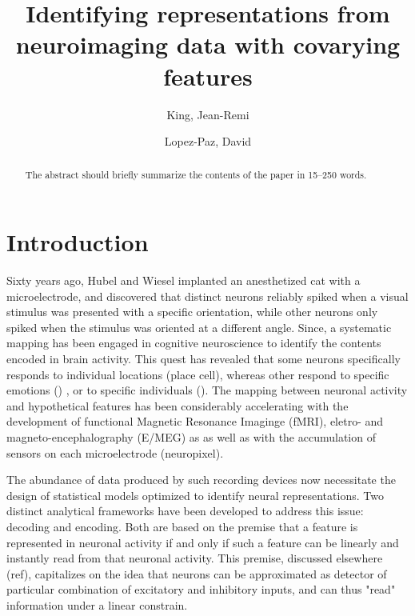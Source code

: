 \documentclass[runningheads]{llncs}
\begin{document}
\title{Identifying representations from neuroimaging data with covarying features}

\author{King, Jean-Remi \and Lopez-Paz, David }


\maketitle              %

\begin{abstract}
The abstract should briefly summarize the contents of the paper in
15--250 words.

\end{abstract}

\section{Introduction}
Sixty years ago, Hubel and Wiesel implanted an anesthetized cat with a microelectrode, and discovered that distinct neurons reliably spiked when a visual stimulus was presented with a specific orientation, while other neurons only spiked when the stimulus was oriented at a different angle. Since, a systematic mapping has been engaged in cognitive neuroscience to identify the contents encoded in brain activity. This quest has revealed that some neurons specifically responds to individual locations (place cell), whereas other respond to specific emotions () , or to specific individuals (). The mapping between neuronal activity and hypothetical features has been considerably accelerating with the development of functional Magnetic Resonance Imaginge (fMRI), eletro- and magneto-encephalography (E/MEG) as as well as with the accumulation of sensors on each microelectrode (neuropixel).

The abundance of data produced by such recording devices now necessitate the design of statistical models optimized to identify neural representations. Two distinct analytical frameworks have been developed to address this issue: decoding and encoding. Both are based on the premise that a feature is represented in neuronal activity if and only if such a feature can be linearly and instantly read from that neuronal activity. This premise, discussed elsewhere (ref), capitalizes on the idea that neurons can be approximated as detector of particular combination of excitatory and inhibitory inputs, and can thus "read" information under a linear constrain.
\end{document}
